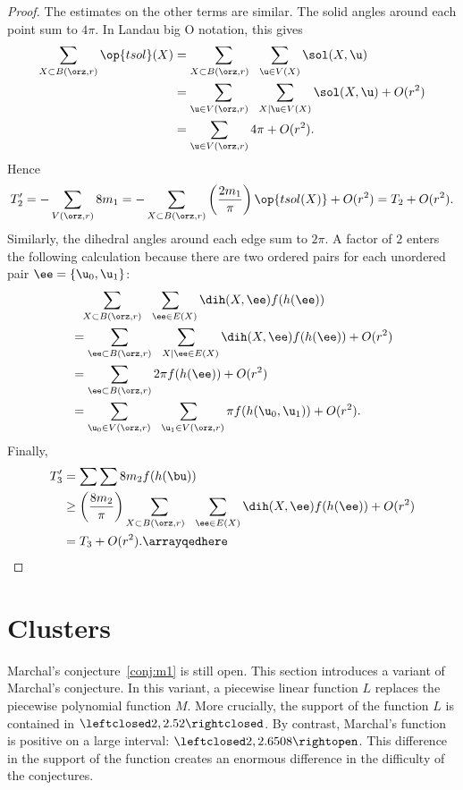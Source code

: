 \begin{proof}
The estimates on the other terms are similar.  The solid angles
around each point sum to $4\pi$.
In Landau big O notation, this gives
\begin{align*} 
\sum_{X\subset B(\orz,r)} \op{tsol}(X) &= 
\sum_{X\subset B(\orz,r)~~} \sum_{ \u\in V( X)} \sol(X, \u)\\
&=\sum_{ \u\in  V(\orz,r)~~} \sum_{X\mid  \u\in V( X)} \sol(X, \u) + O(r^2)\\
&=\sum_{ \u\in  V(\orz,r)} 4\pi    + O(r^2).
\end{align*}
%
Hence
\[  
T_2' = -\sum_{ V(\orz,r)} 8 m_1 = 
-\sum_{X\subset B(\orz,r)}\left(\frac{2m_1}\pi\right) 
\op{tsol(X)} + O(r^2) = T_2 + O(r^2).
\] 
Similarly, the dihedral angles around each edge sum to $2\pi$.  A
factor of $2$ enters the following calculation because there are two
ordered pairs for each unordered pair $\ee=\{ \u_0, \u_1\}$:
\begin{align*} 
&\phantom{=}\sum_{X\subset B(\orz,r)} 
\sum_{~~\ee\in E(X)} \dih(X,\ee)  f(h(\ee)) \vspace{3pt}\\
&=\sum_{\ee\subset B(\orz,r)} 
\sum_{~~X\mid \ee\in E(X)} \dih(X,\ee)  f(h(\ee)) +O(r^2)\vspace{3pt}\\
&=\sum_{\ee\subset B(\orz,r)} 2\pi f(h(\ee)) + O(r^2)\vspace{3pt} \\
&=\sum_{ \u_0\in  V(\orz,r)} 
\sum_{~~\u_1\in  V(\orz,r) } \pi f(h( \u_0, \u_1)) + O(r^2).\\
\end{align*}
Finally,
\arrayqed
\begin{align*} 
T_3' &= \sum\sum 8 m_2 f(h(\bu)) \\
&\ge \left(\frac{8m_2}\pi\right)
\sum_{X\subset B(\orz,r)~~}\sum_{\ee\in E(X)}\dih(X,\ee) f(h(\ee)) + O(r^2) \\
&= T_3 + O(r^2).\arrayqedhere
\end{align*}
\end{proof}




\section{Clusters}

Marchal's conjecture~\ref{conj:m1} is still open.  This section
introduces a variant of Marchal's conjecture.  In this variant, a
piecewise linear function $L$ replaces the piecewise polynomial
function $M$.  More crucially, the support of the function $L$ is
contained in $\leftclosed2,2.52\rightclosed$.  By contrast, Marchal's
function is positive on a large interval:
$\leftclosed2,2.6508\rightopen$.  This difference in the support of
the function creates an enormous difference in the difficulty of the
conjectures.


